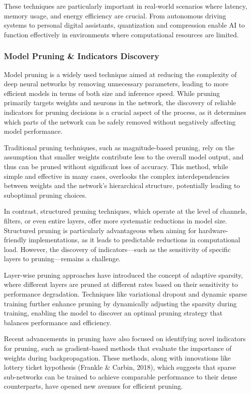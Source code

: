 \documentclass{article} %
\begin{document}
These techniques are particularly important in real-world scenarios where latency, memory usage, and energy efficiency are crucial. From autonomous driving systems to personal digital assistants, quantization and compression enable AI to function effectively in environments where computational resources are limited.

\subsubsection{Model Pruning \& Indicators Discovery}

Model pruning is a widely used technique aimed at reducing the complexity of deep neural networks by removing unnecessary parameters, leading to more efficient models in terms of both size and inference speed. While pruning primarily targets weights and neurons in the network, the discovery of reliable indicators for pruning decisions is a crucial aspect of the process, as it determines which parts of the network can be safely removed without negatively affecting model performance.

Traditional pruning techniques, such as magnitude-based pruning, rely on the assumption that smaller weights contribute less to the overall model output, and thus can be pruned without significant loss of accuracy. This method, while simple and effective in many cases, overlooks the complex interdependencies between weights and the network's hierarchical structure, potentially leading to suboptimal pruning choices.

In contrast, structured pruning techniques, which operate at the level of channels, filters, or even entire layers, offer more systematic reductions in model size. Structured pruning is particularly advantageous when aiming for hardware-friendly implementations, as it leads to predictable reductions in computational load. However, the discovery of indicators—such as the sensitivity of specific layers to pruning—remains a challenge.

Layer-wise pruning approaches have introduced the concept of adaptive sparsity, where different layers are pruned at different rates based on their sensitivity to performance degradation. Techniques like variational dropout and dynamic sparse training further enhance pruning by dynamically adjusting the sparsity during training, enabling the model to discover an optimal pruning strategy that balances performance and efficiency.

Recent advancements in pruning have also focused on identifying novel indicators for pruning, such as gradient-based methods that evaluate the importance of weights during backpropagation. These methods, along with innovations like lottery ticket hypothesis (Frankle \& Carbin, 2018), which suggests that sparse sub-networks can be trained to achieve comparable performance to their dense counterparts, have opened new avenues for efficient pruning.
\end{document}
